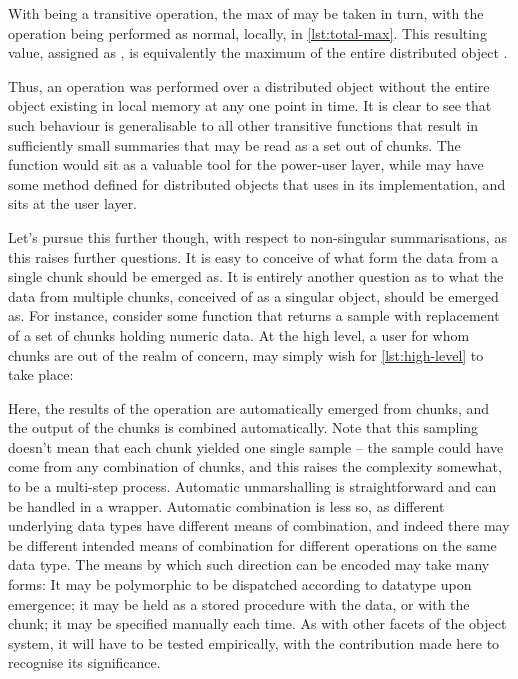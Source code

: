 
With  being a transitive operation, the max of  may be taken in turn, with the operation being performed as normal, locally, in \cref{lst:total-max}.
This resulting value, assigned as , is equivalently the maximum of the entire distributed object .


Thus, an operation was performed over a distributed object without the entire object existing in local memory at any one point in time.
It is clear to see that such behaviour is generalisable to all other transitive functions that result in sufficiently small summaries that may be read as a set out of chunks.
The  function would sit as a valuable tool for the power-user layer, while  may have some method defined for distributed objects that uses  in its implementation, and sits at the user layer.

Let's pursue this further though, with respect to non-singular summarisations, as this raises further questions.
It is easy to conceive of what form the data from a single chunk should be emerged as.
It is entirely another question as to what the data from multiple chunks, conceived of as a singular object, should be emerged as.
For instance, consider some function that returns a sample with replacement of a set of chunks holding numeric data.
At the high level, a user for whom chunks are out of the realm of concern, may simply wish for \cref{lst:high-level} to take place:


Here, the results of the operation are automatically emerged from chunks, and the output of the chunks is combined automatically.
Note that this sampling doesn't mean that each chunk yielded one single sample -- the sample could have come from any combination of chunks, and this raises the complexity somewhat, to be a multi-step process.
Automatic unmarshalling is straightforward and can be handled in a wrapper.
Automatic combination is less so, as different underlying data types have different means of combination, and indeed there may be different intended means of combination for different operations on the same data type.
The means by which such direction can be encoded may take many forms: It may be polymorphic to be dispatched according to datatype upon emergence; it may be held as a stored procedure with the data, or with the chunk; it may be specified manually each time.
As with other facets of the object system, it will have to be tested empirically, with the contribution made here to recognise its significance.

